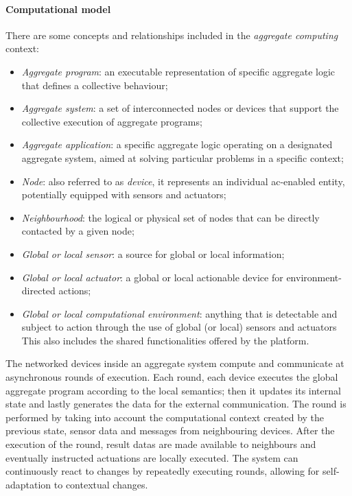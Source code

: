 \paragraph{Computational model}
There are some concepts and relationships included in the \emph{aggregate computing} context:
\begin{itemize}
    \item \emph{Aggregate program}: an executable representation of specific aggregate logic that defines a collective behaviour;
    \item \emph{Aggregate system}: a set of interconnected nodes or devices that support the collective execution of aggregate programs;
    \item \emph{Aggregate application}: a specific aggregate logic operating on a designated aggregate system, aimed at
        solving particular problems in a specific context;
    \item \emph{Node}: also referred to as \emph{device}, it represents an individual \ac{ac}-enabled entity, potentially
        equipped with sensors and actuators;
    \item \emph{Neighbourhood}: the logical or physical set of nodes that can be directly contacted by a given node;
    \item \emph{Global or local sensor}: a source for global or local information;
    \item \emph{Global or local actuator}: a global or local actionable device for environment-directed actions;
    \item \emph{Global or local computational environment}: anything that is detectable and subject to action through the
        use of global (or local) sensors and actuators
        This also includes the shared functionalities offered by the platform.
\end{itemize}

The networked devices inside an aggregate system compute and communicate at asynchronous rounds of execution.
Each round, each device executes the global aggregate program according to the local semantics; then it updates its internal
state and lastly generates the data for the external communication.
The round is performed by taking into account the computational context created by the previous state, sensor data and
messages from neighbouring devices.
After the execution of the round, result datas are made available to neighbours and eventually instructed actuations are
locally executed.
The system can continuously react to changes by repeatedly executing rounds, allowing for self-adaptation to contextual changes.


